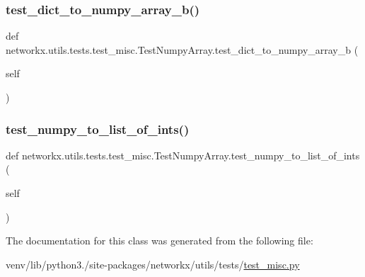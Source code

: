 \subsubsection{\texorpdfstring{test\+\_\+dict\+\_\+to\+\_\+numpy\+\_\+array\+\_\+b()}{test\_dict\_to\_numpy\_array\_b()}}
{\footnotesize\ttfamily def networkx.\+utils.\+tests.\+test\+\_\+misc.\+Test\+Numpy\+Array.\+test\+\_\+dict\+\_\+to\+\_\+numpy\+\_\+array\+\_\+b (\begin{DoxyParamCaption}\item[{}]{self }\end{DoxyParamCaption})}

\mbox{\label{classnetworkx_1_1utils_1_1tests_1_1test__misc_1_1TestNumpyArray_abdf8679e374f940fe97f2a34fe21f9b2}} 
\subsubsection{\texorpdfstring{test\+\_\+numpy\+\_\+to\+\_\+list\+\_\+of\+\_\+ints()}{test\_numpy\_to\_list\_of\_ints()}}
{\footnotesize\ttfamily def networkx.\+utils.\+tests.\+test\+\_\+misc.\+Test\+Numpy\+Array.\+test\+\_\+numpy\+\_\+to\+\_\+list\+\_\+of\+\_\+ints (\begin{DoxyParamCaption}\item[{}]{self }\end{DoxyParamCaption})}



The documentation for this class was generated from the following file\+:\begin{DoxyCompactItemize}
\item 
venv/lib/python3./site-\/packages/networkx/utils/tests/\hyperlink{test__misc_8py}{test\+\_\+misc.\+py}\end{DoxyCompactItemize}
